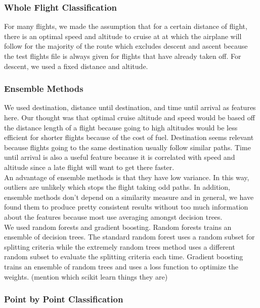 \documentclass{article}[12pt]
\begin{document}
\begin{multicols}{2}
\subsubsection{Whole Flight Classification}
For many flights, we made the assumption that for a certain distance of flight, there is an optimal speed and altitude to cruise at at which the airplane will follow for the majority of the route which excludes descent and ascent because the test flights file is always given for flights that have already taken off. For descent, we used a fixed distance and altitude.

\subsubsection{Ensemble Methods}
We used destination, distance until destination, and time until arrival as features here. Our thought was that optimal cruise altitude and speed would be based off the distance length of a flight because going to high altitudes would be less efficient for shorter flights because of the cost of fuel. Destination seems relevant because flights going to the same destination usually follow similar paths. Time until arrival is also a useful feature because it is correlated with speed and altitude since a late flight will want to get there faster.
\\
An advantage of ensemble methods is that they have low variance. In this way, outliers are unlikely which stops the flight taking odd paths. In addition, ensemble methods don't depend on a similarity measure and in general, we have found them to produce pretty consistent results without too much information about the features because most use averaging amongst decision trees.\\
We used random forests and gradient boosting. Random forests trains an ensemble of decision trees. The standard random forest uses a random subset for splitting criteria while the extremely random trees method uses a different random subset to evaluate the splitting criteria each time. Gradient boosting trains an ensemble of random trees and uses a loss function to optimize the weights. 
(mention which scikit learn things they are)\\






\subsubsection{Point by Point Classification}


\end{multicols}
\end{document}
